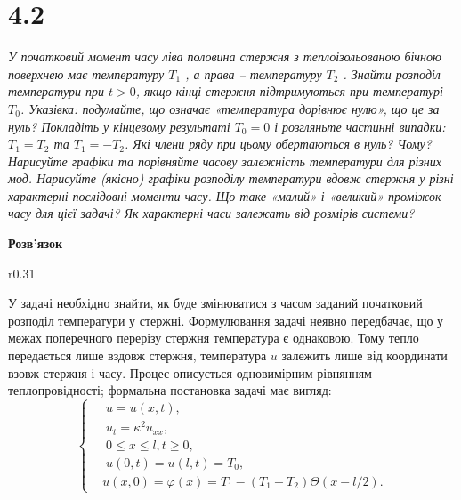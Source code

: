 

%


\clearpage

\section[Задача №4.2]{4.2}

\textit{У початковий момент часу ліва половина стержня з теплоізольованою бічною поверхнею має температуру $T_1$ , а права -- температуру $T_2$ . Знайти розподіл температури при $t> 0$, якщо кінці стержня підтримуються при температурі $T_0$. Указівка: подумайте, що означає «температура дорівнює нулю», що це за нуль? Покладіть у кінцевому результаті $T_0 = 0$ і розгляньте частинні випадки: $T_1 = T_2$ та $T_1 = -T_2$. Які члени ряду при цьому обертаються в нуль? Чому? Нарисуйте графіки та порівняйте часову залежність температури для     різних мод. Нарисуйте (якісно) графіки розподілу     температури вдовж стержня у різні характерні послідовні моменти часу. Що таке «малий» і «великий» проміжок часу для цієї задачі? Як характерні часи залежать від розмірів системи?}

\begin{center}
    \textbf{Розв'язок}
\end{center}

\begin{wrapfigure}{r}{0.31\textwidth}
    \centering
\end{wrapfigure}

У задачі необхідно знайти, як буде змінюватися з часом заданий початковий розподіл температури у стержні. Формулювання задачі неявно передбачає, що у межах поперечного перерізу стержня температура є однаковою. Тому тепло передається лише вздовж стержня, температура $u$ залежить лише від координати взовж стержня і часу. Процес описується одновимірним рівнянням теплопровідності; формальна постановка задачі має вигляд:
\begin{equation} \label{cond4,2}
    \left\{ \begin{aligned}
        &\;u = u(x,t), \\
        &\;u_{t} = \kappa^2 u_{xx}, \\
        &\;0 \leq x \leq l, t \geq 0, \\
        &\;u(0,t) = u(l,t) = T_0,\\
        &u(x,0) = \varphi(x) = T_1 - (T_1 - T_2)\Theta(x - l/2).
    \end{aligned} \right.
\end{equation}
\vspace{1cm}

